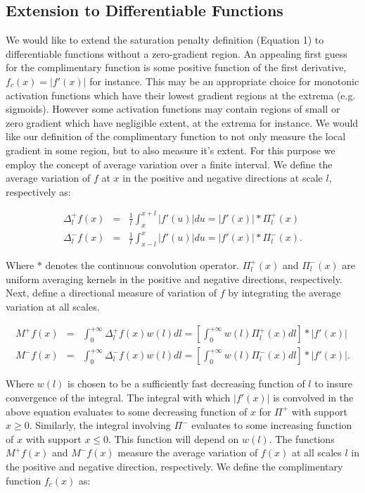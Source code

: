 \subsection{Extension to Differentiable Functions} We would like to extend the
saturation penalty definition (Equation 1) to differentiable functions without
a zero-gradient region. An appealing first guess for the complimentary function
is some positive function of the first derivative, $f_c(x) = |f'(x)|$ for
instance. This may be an appropriate choice for monotonic activation functions
which have their lowest gradient regions at the extrema (e.g. sigmoids).
However some activation functions may contain regions of small or zero gradient
which have negligible extent, at the extrema for instance. We would like our
definition of the complimentary function to not only measure the local gradient
in some region, but to also measure it's extent. For this purpose we employ the
concept of average variation over a finite interval. We define the average
variation of $f$ at $x$ in the positive and negative directions at scale $l$,
respectively as: 

\begin{eqnarray} \nonumber \Delta_l^+ f(x) &=& \frac{1}{l} \int_x ^{x+l}
|f'(u)| du = |f'(x)| * \Pi_l^+(x)\\ \nonumber \Delta_l^- f(x) &=& \frac{1}{l}
\int_{x-l} ^x |f'(u)| du = |f'(x)| * \Pi_l^-(x).  \end{eqnarray} 

Where $*$ denotes the continuous convolution operator. $\Pi_l^+(x)$ and
$\Pi_l^-(x)$ are uniform averaging kernels in the positive and negative
directions, respectively. Next, define a directional measure of variation of
$f$ by integrating the average variation at all scales. 

\begin{eqnarray} \nonumber M^+ f(x) &=& \int_0^{+\infty} \Delta_l^+ f(x) w(l)dl
= \left[\int_0^{+\infty} w(l) \Pi^+_l(x) dl \right] * |f'(x)| \\ \nonumber M^-
f(x) &=& \int_0^{+\infty} \Delta_l^- f(x) w(l)dl = \left[\int_0^{+\infty} w(l)
\Pi^-_l(x) dl \right] * |f'(x)| .  \end{eqnarray} 

Where $w(l)$ is chosen to be a sufficiently fast decreasing function of $l$ to
insure convergence of the integral. The integral with which $|f'(x)|$ is
convolved in the above equation evaluates to some decreasing function of $x$
for $\Pi^+$ with support $x \geq 0$. Similarly, the integral involving $\Pi^-$
evaluates to some increasing function of $x$ with support $x \leq 0$. This
function will depend on $w(l)$. The functions $M^+f(x)$ and $M^-f(x)$ measure
the average variation of $f(x)$ at all scales $l$ in the positive and negative
direction, respectively. We define the complimentary function $f_c(x)$ as: 

